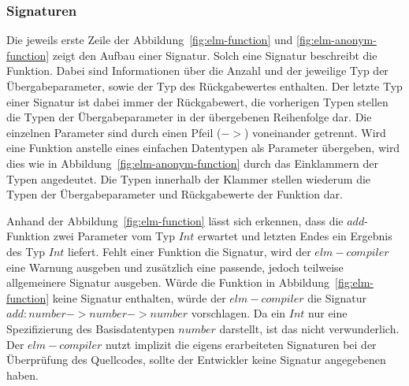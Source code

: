 \subsubsection{Signaturen}
\label{sec:Signaturen}
Die jeweils erste Zeile der Abbildung~\ref{fig:elm-function} und \ref{fig:elm-anonym-function} zeigt den Aufbau einer Signatur. Solch eine Signatur beschreibt die Funktion. Dabei sind Informationen über die Anzahl und der jeweilige Typ der Übergabeparameter, sowie der Typ des Rückgabewertes enthalten. Der letzte Typ einer Signatur ist dabei immer der Rückgabewert, die vorherigen Typen stellen die Typen der Übergabeparameter in der übergebenen Reihenfolge dar. Die einzelnen Parameter sind durch einen Pfeil ($->$) voneinander getrennt. Wird eine Funktion anstelle eines einfachen Datentypen als Parameter übergeben, wird dies wie in Abbildung~\ref{fig:elm-anonym-function} durch das Einklammern der Typen angedeutet. Die Typen innerhalb der Klammer stellen wiederum die Typen der Übergabeparameter und Rückgabewerte der Funktion dar.

Anhand der Abbildung~\ref{fig:elm-function} lässt sich erkennen, dass die $add$-Funktion zwei Parameter vom Typ $Int$ erwartet und letzten Endes ein Ergebnis des Typ $Int$ liefert. Fehlt einer Funktion die Signatur, wird der $elm-compiler$ eine Warnung ausgeben und zusätzlich eine passende, jedoch teilweise allgemeinere Signatur ausgeben. Würde die Funktion in Abbildung~\ref{fig:elm-function} keine Signatur enthalten, würde der $elm-compiler$ die Signatur $add : number -> number -> number$ vorschlagen. Da ein $Int$ nur eine Spezifizierung des Basisdatentypen $number$ darstellt, ist das nicht verwunderlich. Der $elm-compiler$ nutzt implizit die eigens erarbeiteten Signaturen bei der Überprüfung des Quellcodes, sollte der Entwickler keine Signatur angegebenen haben.


